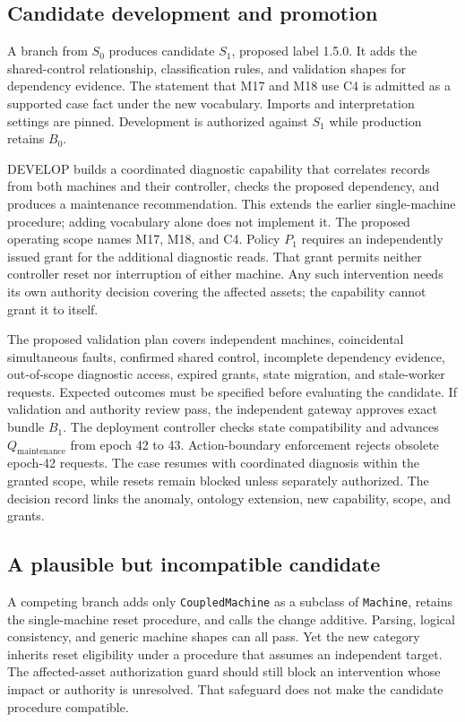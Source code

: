 \documentclass[preprint,12pt,authoryear]{elsarticle}
\begin{document}
\subsection{Candidate development and
promotion}\label{candidate-development-and-promotion}

A branch from \(S_0\) produces candidate \(S_1\), proposed label 1.5.0.
It adds the shared-control relationship, classification rules, and
validation shapes for dependency evidence. The statement that M17 and
M18 use C4 is admitted as a supported case fact under the new
vocabulary. Imports and interpretation settings are pinned. Development
is authorized against \(S_1\) while production retains \(B_0\).

DEVELOP builds a coordinated diagnostic capability that correlates
records from both machines and their controller, checks the proposed
dependency, and produces a maintenance recommendation. This extends the
earlier single-machine procedure; adding vocabulary alone does not
implement it. The proposed operating scope names M17, M18, and C4.
Policy \(P_1\) requires an independently issued grant for the additional
diagnostic reads. That grant permits neither controller reset nor
interruption of either machine. Any such intervention needs its own
authority decision covering the affected assets; the capability cannot
grant it to itself.

The proposed validation plan covers independent machines, coincidental
simultaneous faults, confirmed shared control, incomplete dependency
evidence, out-of-scope diagnostic access, expired grants, state
migration, and stale-worker requests. Expected outcomes must be
specified before evaluating the candidate. If validation and authority
review pass, the independent gateway approves exact bundle \(B_1\). The
deployment controller checks state compatibility and advances
\(Q_{\mathrm{maintenance}}\) from epoch 42 to 43. Action-boundary
enforcement rejects obsolete epoch-42 requests. The case resumes with
coordinated diagnosis within the granted scope, while resets remain
blocked unless separately authorized. The decision record links the
anomaly, ontology extension, new capability, scope, and grants.

\subsection{A plausible but incompatible
candidate}\label{a-plausible-but-incompatible-candidate}

A competing branch adds only \texttt{CoupledMachine} as a subclass of
\texttt{Machine}, retains the single-machine reset procedure, and calls
the change additive. Parsing, logical consistency, and generic machine
shapes can all pass. Yet the new category inherits reset eligibility
under a procedure that assumes an independent target. The affected-asset
authorization guard should still block an intervention whose impact or
authority is unresolved. That safeguard does not make the candidate
procedure compatible.
\end{document}
